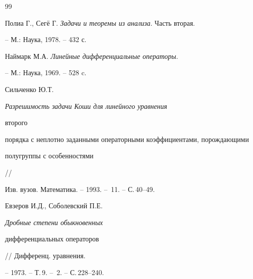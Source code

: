 \begin{thebibliography}{99}


Полиа Г., Сег\"е{} Г. {\em Задачи и теоремы из анализа}. Часть вторая. 


-- М.: Наука, 1978. -- 432 с.  




Наймарк М.А. {\em Линейные дифференциальные операторы}. 


-- М.: Наука, 1969. -- 528 c. 




Сильченко Ю.Т. {\em Разрешимость задачи Коши для линейного уравнения 


второго  


порядка с неплотно заданными операторными коэффициентами, порождающими 


полугруппы с особенностями} // 


Изв. вузов. Математика. -- 1993. -- \No\,11. -- С.\,40--49. 




Евзеров И.Д., Соболевский П.Е. {\em Дробные степени обыкновенных 


дифференциальных операторов} // Дифференц. уравнения. 


-- 1973. -- Т.\,9. -- \No\,2. -- С.\,228--240. 


 


\end{thebibliography}  


  


\vskip 2cm  


  






  


\label{end}  


  


